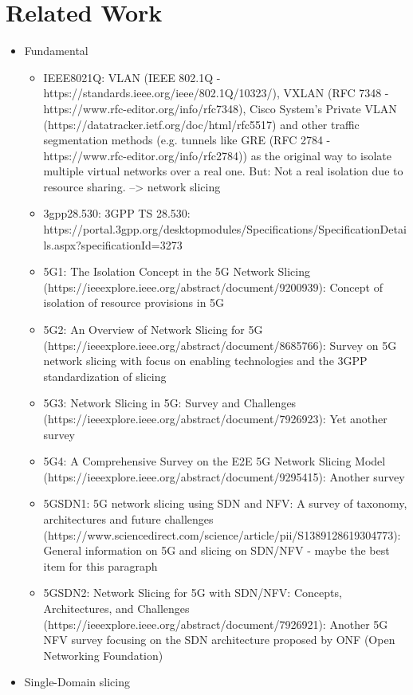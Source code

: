 \documentclass{article}
\begin{document}
\section{Related Work}
\iffalse
\begin{itemize}
    \item Fundamental
    \begin{itemize}
        \item IEEE8021Q: VLAN (IEEE 802.1Q - https://standards.ieee.org/ieee/802.1Q/10323/), VXLAN (RFC 7348 - https://www.rfc-editor.org/info/rfc7348), Cisco System's Private VLAN (https://datatracker.ietf.org/doc/html/rfc5517) and other traffic segmentation methods (e.g. tunnels like GRE (RFC 2784 - https://www.rfc-editor.org/info/rfc2784)) as the original way to isolate multiple virtual networks over a real one. But: Not a real isolation due to resource sharing. --> network slicing
        \item 3gpp28.530: 3GPP TS 28.530: https://portal.3gpp.org/desktopmodules/Specifications/SpecificationDetails.aspx?specificationId=3273
        \item 5G1: The Isolation Concept in the 5G Network Slicing (https://ieeexplore.ieee.org/abstract/document/9200939): Concept of isolation of resource provisions in 5G
        \item 5G2: An Overview of Network Slicing for 5G (https://ieeexplore.ieee.org/abstract/document/8685766): Survey on 5G network slicing with focus on enabling technologies and the 3GPP standardization of slicing
        \item 5G3: Network Slicing in 5G: Survey and Challenges (https://ieeexplore.ieee.org/abstract/document/7926923): Yet another survey
        \item 5G4: A Comprehensive Survey on the E2E 5G Network Slicing Model (https://ieeexplore.ieee.org/abstract/document/9295415): Another survey
        \item 5GSDN1: 5G network slicing using SDN and NFV: A survey of taxonomy, architectures and future challenges (https://www.sciencedirect.com/science/article/pii/S1389128619304773): General information on 5G and slicing on SDN/NFV - maybe the best item for this paragraph
        \item 5GSDN2: Network Slicing for 5G with SDN/NFV: Concepts, Architectures, and Challenges (https://ieeexplore.ieee.org/abstract/document/7926921): Another 5G NFV survey focusing on the SDN architecture proposed by ONF (Open Networking Foundation)
    \end{itemize}
    \item Single-Domain slicing

\end{itemize}
\end{document}
